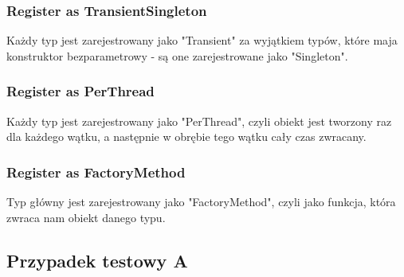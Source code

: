 \documentclass[12pt]{article}
\begin{document}
\subsubsection{Register as TransientSingleton}
Każdy typ jest zarejestrowany jako "Transient" za wyjątkiem typów, które maja konstruktor bezparametrowy - są one zarejestrowane jako "Singleton".

\subsubsection{Register as PerThread}
Każdy typ jest zarejestrowany jako "PerThread", czyli obiekt jest tworzony raz dla każdego wątku, a następnie w obrębie tego wątku cały czas zwracany.

\subsubsection{Register as FactoryMethod}
{\color{red}Typ główny jest zarejestrowany jako "FactoryMethod", czyli jako funkcja, która zwraca nam obiekt danego typu.}

\subsection{Przypadek testowy A}
\end{document}
